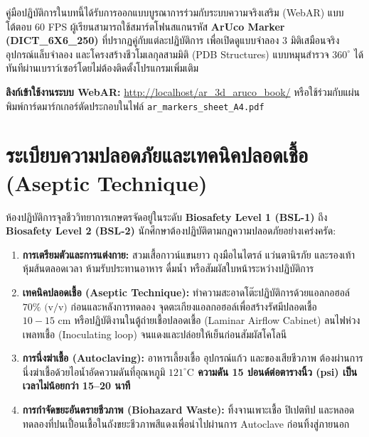 \begin{arinteraction}
คู่มือปฏิบัติการในบทนี้ได้รับการออกแบบบูรณาการร่วมกับระบบความจริงเสริม (WebAR) แบบโต้ตอบ 60 FPS ผู้เรียนสามารถใช้สมาร์ตโฟนสแกนรหัส \textbf{ArUco Marker (DICT\_6X6\_250)} ที่ปรากฏคู่กับแต่ละปฏิบัติการ เพื่อเปิดดูแบบจำลอง 3 มิติเสมือนจริง อุปกรณ์แล็บจำลอง และโครงสร้างชีวโมเลกุลสามมิติ (PDB Structures) แบบหมุนสำรวจ $360^\circ$ ได้ทันทีผ่านเบราว์เซอร์โดยไม่ต้องติดตั้งโปรแกรมเพิ่มเติม

\vspace{1mm}
\noindent\textbf{ลิงก์เข้าใช้งานระบบ WebAR:} \url{http://localhost/ar_3d_aruco_book/} หรือใช้ร่วมกับแผ่นพิมพ์การ์ดมาร์กเกอร์ตัดประกอบในไฟล์ \texttt{ar\_markers\_sheet\_A4.pdf}
\end{arinteraction}

\section{ระเบียบความปลอดภัยและเทคนิคปลอดเชื้อ (Aseptic Technique)}

ห้องปฏิบัติการจุลชีววิทยาการเกษตรจัดอยู่ในระดับ \textbf{Biosafety Level 1 (BSL-1)} ถึง \textbf{Biosafety Level 2 (BSL-2)} นักศึกษาต้องปฏิบัติตามกฎความปลอดภัยอย่างเคร่งครัด:
\begin{enumerate}
    \item \textbf{การเตรียมตัวและการแต่งกาย:} สวมเสื้อกาวน์แขนยาว ถุงมือไนไตรล์ แว่นตานิรภัย และรองเท้าหุ้มส้นตลอดเวลา ห้ามรับประทานอาหาร ดื่มน้ำ หรือสัมผัสใบหน้าระหว่างปฏิบัติการ
    \item \textbf{เทคนิคปลอดเชื้อ (Aseptic Technique):} ทำความสะอาดโต๊ะปฏิบัติการด้วยแอลกอฮอล์ $70\% \text{ (v/v)}$ ก่อนและหลังการทดลอง จุดตะเกียงแอลกอฮอล์เพื่อสร้างรัศมีปลอดเชื้อ $10 - 15\text{ cm}$ หรือปฏิบัติงานในตู้ถ่ายเชื้อปลอดเชื้อ (Laminar Airflow Cabinet) ลนไฟห่วงเพลทเชื้อ (Inoculating loop) จนแดงและปล่อยให้เย็นก่อนสัมผัสโคโลนี
    \item \textbf{การนึ่งฆ่าเชื้อ (Autoclaving):} อาหารเลี้ยงเชื้อ อุปกรณ์แก้ว และของเสียชีวภาพ ต้องผ่านการนึ่งฆ่าเชื้อด้วยไอน้ำอัดความดันที่อุณหภูมิ \textbf{$121^\circ\text{C}$ ความดัน 15 ปอนด์ต่อตารางนิ้ว (psi) เป็นเวลาไม่น้อยกว่า 15--20 นาที}
    \item \textbf{การกำจัดขยะอันตรายชีวภาพ (Biohazard Waste):} ทิ้งจานเพาะเชื้อ ปิเปตทิป และหลอดทดลองที่ปนเปื้อนเชื้อในถังขยะชีวภาพสีแดงเพื่อนำไปผ่านการ Autoclave ก่อนทิ้งสู่ภายนอก
\end{enumerate}

